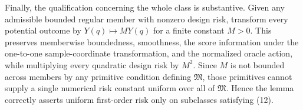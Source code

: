 Finally, the qualification concerning the whole class is substantive.  Given any admissible bounded regular member with nonzero design risk, transform every potential outcome by \(Y(q)\mapsto M Y(q)\) for a finite constant \(M>0\).  This preserves memberwise boundedness, smoothness, the score information under the one-to-one sample-coordinate transformation, and the normalized oracle action, while multiplying every quadratic design risk by \(M^2\).  Since \(M\) is not bounded across members by any primitive condition defining \(\mathfrak M\), those primitives cannot supply a single numerical risk constant uniform over all of \(\mathfrak M\).  Hence the lemma correctly asserts uniform first-order risk only on subclasses satisfying (12).
